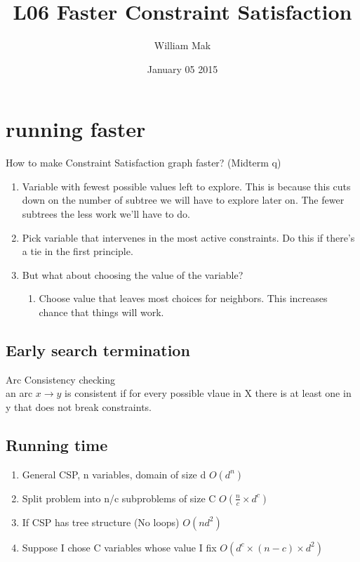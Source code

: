 \documentclass{article}
\title{L06 \- Faster Constraint Satisfaction}
\author{William Mak}
\date{January 05 2015}
\begin{document}
\maketitle
\section{running faster}
How to make Constraint Satisfaction graph faster? (Midterm q)\\
\begin{enumerate}
	\item Variable with fewest possible values left to explore. This is because
		this cuts down on the number of subtree we will have to explore later
		on. The fewer subtrees the less work we'll have to do.
	\item Pick variable that intervenes in the most active constraints. Do this
		if there's a tie in the first principle.
	\item But what about choosing the value of the variable?
		\begin{enumerate}
			\item Choose value that leaves most choices for neighbors. This
				increases chance that things will work.
		\end{enumerate}
\end{enumerate}

\subsection{Early search termination}
Arc Consistency checking\\
an arc $x \to y$ is consistent if for every possible vlaue in X there is at
least one in y that does not break constraints.

\subsection{Running time}
\begin{enumerate}
	\item General CSP, n variables, domain of size d
		\subitem $O(d^n)$
	\item Split problem into n/c subproblems of size C
		\subitem $O(\frac{n}{c} \times d^c)$
	\item If CSP has tree structure (No loops)
		\subitem $O(nd^2)$
	\item Suppose I chose C variables whose value I fix 
		\subitem $O(d^c \times (n-c) \times d^2)$
\end{enumerate}
\end{document}
